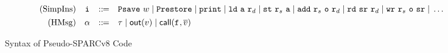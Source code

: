 \begin{figure*}[!t]
\[\begin{array}{rcclcrccl}
{            }  
            \\
            \\[-8pt]
            \TYPE{(SimpIns)} & \simplins{} & \define & 
            \multicolumn{6}{l}
            {
                \Psave \ \word \sepline \Prestore  \sepline \cprint \sepline 
                \ld{} \ \aexp \ \reg{d} \sepline 
                \st{} \ \reg{s} \ \aexp \sepline \cadd{} \ \reg{s} \ \oexp \ \reg{d}
                \sepline
                \rd \ \sr \ \reg{d} \sepline \cwr \ \reg{s} \ \oexp \ \sr 
                \sepline \dots
            } 
            \\
            \\[-8pt]
            \TYPE{(HMsg)} & \hmsg & \define & \empmsg \sepline \outEvt{\val} \sepline 
            \callEvt{\lab{}, \args{\val}} 
        \end{array}
    \]
    \vspace{-1em}
    \caption{Syntax of Pseudo-SPARCv8 Code}
    \label{fig:syntax-of-concur-pseudo-sparc}
    \vspace{-1em}
\end{figure*}
